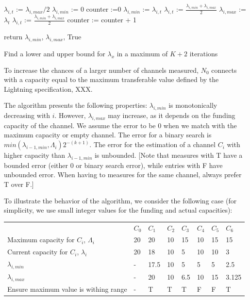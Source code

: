 \begin{algorithm}
\begin{algorithmic}[1]
    \State
    \State $\lambda_{i,t}$ := $\lambda_{i, max} / 2$
    \State $\lambda_{i, min}$ := 0
    \State counter :=0    
        \State $\lambda_{i,min}$ := $\lambda_{i,t}$
        \State $\lambda_{i,t}$ := $\frac{\lambda_{i, min} + \lambda_{i,max}}{2}$
        \Else
            \State $\lambda_{i,max}$ := $\lambda_t$
            \State $\lambda_{i,t}$ := $\frac{\lambda_{i,min} + \lambda_{i,max}}{2}$
        \EndIf
        \State counter := counter + 1
    \EndWhile 
    

    \State return $\lambda_{i,min}$, $\lambda_{i,max}$, True

    \EndProcedure
    \end{algorithmic}
    \caption{Find a lower and upper bound for  $\lambda_{x}$ in a maximum of $K+2$ iterations}
\label{alg:actual-capacity-x-hops}
\end{algorithm}


To increase the chances of a larger number of channels measured, $N_0$ connects with a capacity equal to the maximum transferable value defined by the Lightning specification, XXX. 

The algorithm presents the following properties: $\lambda_{i,min}$ is monotonically decreasing with $i$. 
However, $\lambda_{i,max}$ may increase, as it depends on the funding capacity of the channel.
We assume the error to be 0 when we match with the maximum capacity or empty channel. 
The error for a binary search is $min(\lambda_{i-1, min}, \Lambda_{i}) 2^{-(k+1)}$.
The error for the estimation of a channel $C_i$ with higher capacity than $\lambda_{i-1, min}$ is unbounded.
[Note that measures with T have a bounded error (either 0 or binary search error), while entries with F have unbounded error. When having to measures for the same channel, always prefer T over F.]

To illustrate the behavior of the algorithm, we consider the following case (for simplicity, we use small integer values for the funding and actual capacities):

\begin{table}[]
    \begin{tabular}{llllllll}
     & $C_0$ & $C_1$ & $C_2$ & $C_3$ & $C_4$ & $C_5$ & $C_6$\\
    Maximum capacity for $C_i$, $\Lambda_i$ & 20 & 20 & 10 & 15 & 10 & 15 & 15 \\
    Current capacity for $C_i$, $\lambda_i$ & 20 & 18 & 10 & 5 & 10 & 10 & 3 \\
    $\lambda_{i, min}$ & - & 17.5 & 10 & 5 & 5 & 5 & 2.5 \\
    $\lambda_{i, max}$ & - & 20 & 10 & 6.5 & 10 & 15 & 3.125  \\
    Ensure maximum value is withing range & - & T & T & T  & F & F & T
    \end{tabular}
\end{table}

